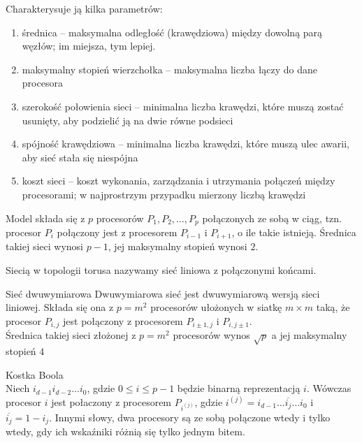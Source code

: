 Charakterysuje ją kilka parametrów:

\begin{enumerate}
 \item średnica – maksymalna odległość (krawędziowa) między dowolną parą węzłów; im miejsza, tym lepiej.
 \item maksymalny stopień wierzchołka – maksymalna liczba łączy do dane procesora
 \item szerokość połowienia sieci – minimalna liczba krawędzi, które muszą zostać usunięty, aby podzielić ją na dwie równe podsieci
 \item spójność krawędziowa – minimalna liczba krawędzi, które muszą ulec awarii, aby sieć stała się niespójna
 \item koszt sieci – koszt wykonania, zarządzania i utrzymania połączeń między procesorami; w najprostrzym przypadku mierzony liczbą krawędzi
\end{enumerate}



\begin{przyklad}
Model składa się z \(p\) procesorów \(P_1, P_2, \dots, P_p\) połączonych ze sobą w ciąg, tzn. procesor \(P_i\) połączony jest z procesorem \(P_{i-1}\) i \(P_{i+1}\), o ile takie istnieją. Średnica takiej sieci wynosi \(p-1\), jej maksymalny stopień wynosi \(2\).\\
\end{przyklad}

\begin{przyklad}[Torus]
Siecią w topologii torusa nazywamy sieć liniowa z połączonymi końcami.
\end{przyklad}

\begin{przyklad}{Sieć dwuwymiarowa}
Dwuwymiarowa sieć jest dwuwymiarową wersją sieci liniowej. Składa się ona z \(p=m^2\) procesorów ułożonych w siatkę \(m\times m\) taką, że procesor \(P_{i,j}\) jest połączony z procesorem \(P_{i\pm 1, j}\) i \(P_{i, j\pm 1}\).\\
Średnica takiej sieci złożonej z \(p=m^2\) procesorów wynos \(\sqrt{p}\) a jej maksymalny stopień \(4\)
\end{przyklad}

\begin{definicja}{Kostka Boola}\\
Niech \(i_{d-1}i_{d-2}\dots i_{0}\), gdzie \(0\leq i \leq p-1\) będzie binarną reprezentacją \(i\). Wówczas procesor \({i}\) jest połaczony z procesorem \(P_{i^(j)}\), gdzie \(i^{(j)}=i_{d-1}\dots \overline{i_j} \dots i_0\) i \(\overline{i_j} = 1 - i_j\). Innymi słowy, dwa procesory są ze sobą połączone wtedy i tylko wtedy, gdy ich wskaźniki różnią się tylko jednym bitem.\\
\end{definicja}

